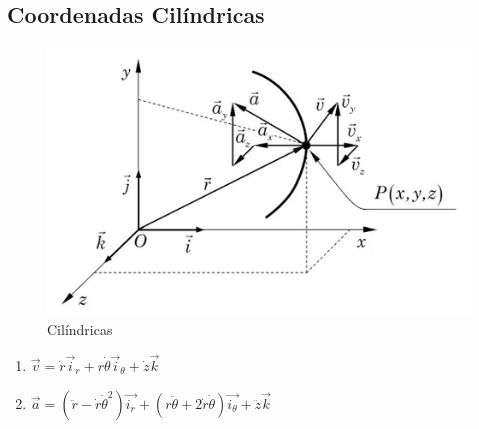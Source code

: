 \documentclass[a4paper, 12pt]{article}
\begin{document}
	\subsection{Coordenadas Cilíndricas}
		\begin{figure}[h]
			\center
			\includegraphics[scale=0.5]{imagens/cc.png} 
			\caption{Cilíndricas}
		\end{figure}	
		
		\begin{enumerate}
			\item $\vec{v} = \dot{r}\vec{i}_r + r\dot{\theta}\vec{i}_{\theta} + \dot{z}\vec{k}$
			\item $\vec{a} = (\ddot{r} - \dot{r}\dot{\theta}^2)\vec{i_r} + (r\ddot{\theta} + 2\dot{r}\dot{\theta})\vec{i_{\theta}} + \ddot{z}\vec{k}$
		\end{enumerate}
	\newpage
\end{document}
